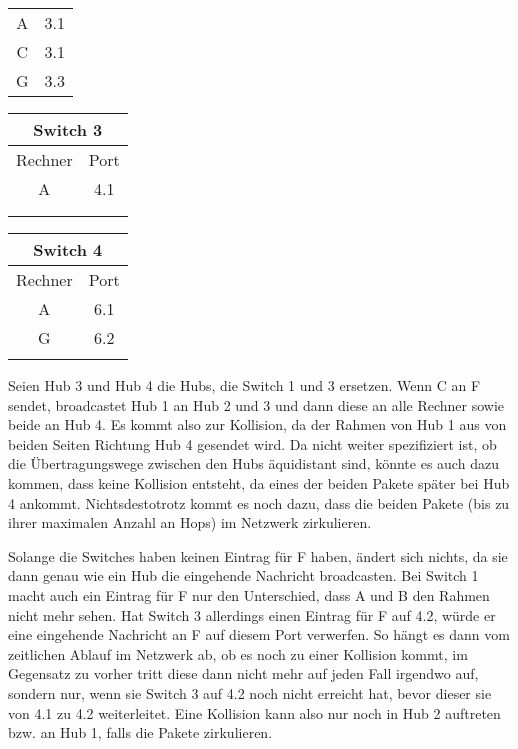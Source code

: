 \documentclass{../exercisesheet}
\begin{document}
\begin{exercise}{4}
\begin{subexercise}
\begin{enumerate}
\begin{center}
\begin{tabular}{c|c}
\hline
A & 3.1 \\
C & 3.1 \\
G & 3.3 \\
\end{tabular}
\begin{tabular}{c|c}
\multicolumn{2}{c}{Switch 3}\\
\hline
Rechner & Port\\
\hline
A & 4.1 \\
  &  \\
  &   \\
\end{tabular}
\begin{tabular}{c|c}
\multicolumn{2}{c}{Switch 4}\\
\hline
Rechner & Port\\
\hline
A & 6.1 \\
G & 6.2 \\
  &   \\
\end{tabular}
\end{center}
\end{enumerate}
\end{subexercise}
\begin{subexercise}
Seien Hub 3 und Hub 4 die Hubs, die Switch 1 und 3 ersetzen. Wenn C an F sendet, broadcastet Hub 1 an Hub 2 und 3 und dann diese an alle Rechner sowie beide an Hub 4.
Es kommt also zur Kollision, da der Rahmen von Hub 1 aus von beiden Seiten Richtung Hub 4 gesendet wird. Da nicht weiter spezifiziert ist, ob die Übertragungswege
zwischen den Hubs äquidistant sind, könnte es auch dazu kommen, dass keine Kollision entsteht, da eines der beiden Pakete später bei Hub 4 ankommt. Nichtsdestotrotz kommt es noch
dazu, dass die beiden Pakete (bis zu ihrer maximalen Anzahl an Hops) im Netzwerk zirkulieren.
\end{subexercise}
\begin{subexercise}
Solange die Switches haben keinen Eintrag für F haben, ändert sich nichts, da sie dann genau wie ein Hub die eingehende Nachricht broadcasten. Bei Switch 1 macht auch ein Eintrag für F nur den Unterschied, dass A und B den Rahmen nicht mehr sehen. Hat Switch 3 allerdings einen Eintrag für F auf 4.2, würde er eine eingehende Nachricht an F auf diesem Port verwerfen. So hängt es dann vom zeitlichen Ablauf im Netzwerk ab, ob es noch zu einer Kollision kommt, im Gegensatz zu vorher tritt diese dann nicht mehr auf jeden Fall irgendwo auf, sondern nur, wenn sie Switch 3 auf 4.2 noch nicht erreicht hat, bevor dieser sie von 4.1 zu 4.2 weiterleitet. Eine Kollision kann also nur noch in Hub 2 auftreten bzw. an Hub 1, falls die Pakete zirkulieren.
\end{subexercise}
\end{exercise}
\end{document}
